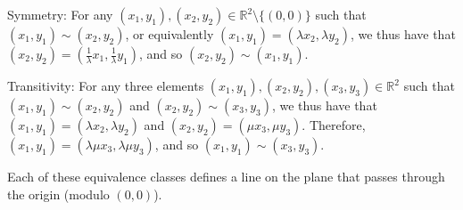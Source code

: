 Symmetry: For any $(x_1, y_1), (x_2, y_2) \in \mathbb{R}^2 \setminus \{(0, 0)\}$ such that $(x_1, y_1) \sim (x_2, y_2)$, or equivalently $(x_1, y_1) = (\lambda x_2, \lambda y_2)$, we thus have that $(x_2, y_2) = \left(\frac{1}{\lambda}x_1, \frac{1}{\lambda}y_1\right)$, and so $(x_2, y_2) \sim (x_1, y_1)$.

\smallskip

Transitivity: For any three elements $(x_1, y_1), (x_2, y_2), (x_3, y_3) \in \mathbb{R}^2$ such that $(x_1, y_1) \sim (x_2, y_2)$ and $(x_2, y_2) \sim (x_3, y_3)$, we thus have that $(x_1, y_1) = (\lambda x_2, \lambda y_2)$ and $(x_2, y_2) = (\mu x_3, \mu y_3)$. Therefore, $(x_1, y_1) = (\lambda\mu x_3, \lambda\mu y_3)$, and so $(x_1, y_1) \sim (x_3, y_3)$.

\smallskip

Each of these equivalence classes defines a line on the plane that passes through the origin (modulo $(0,0)$).